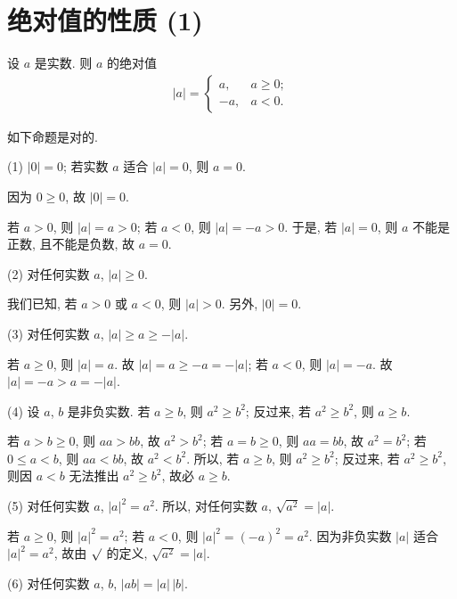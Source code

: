 \documentclass[../libro.tex]{subfiles}
\begin{document}

\section{绝对值的性质 (1)}

设 \(a\) 是实数.
则 \(a\) 的绝对值
\begin{align*}
    |a| =
    \begin{cases}
        a,  & a \geq 0; \\
        -a, & a < 0.
    \end{cases}
\end{align*}

如下命题是对的.

(1)
\(|0| = 0\);
若实数 \(a\) 适合 \(|a| = 0\), 则 \(a = 0\).

因为 \(0 \geq 0\),
故 \(|0| = 0\).

若 \(a > 0\), 则 \(|a| = a > 0\);
若 \(a < 0\), 则 \(|a| = -a > 0\).
于是, 若 \(|a| = 0\), 则 \(a\) 不能是正数,
且不能是负数, 故 \(a = 0\).

(2)
对任何实数 \(a\), \(|a| \geq 0\).

我们已知, 若 \(a > 0\) 或 \(a < 0\), 则 \(|a| > 0\).
另外, \(|0| = 0\).

(3)
对任何实数 \(a\), \(|a| \geq a \geq -|a|\).

若 \(a \geq 0\), 则 \(|a| = a\).
故 \(|a| = a \geq -a = -|a|\);
若 \(a < 0\), 则 \(|a| = -a\).
故 \(|a| = -a > a = -|a|\).

(4)
设 \(a\), \(b\) 是非负实数.
若 \(a \geq b\), 则 \(a^2 \geq b^2\);
反过来, 若 \(a^2 \geq b^2\), 则 \(a \geq b\).

若 \(a > b \geq 0\), 则 \(a a > b b\), 故 \(a^2 > b^2\);
若 \(a = b \geq 0\), 则 \(a a = b b\), 故 \(a^2 = b^2\);
若 \(0 \leq a < b\), 则 \(a a < b b\), 故 \(a^2 < b^2\).
所以, 若 \(a \geq b\), 则 \(a^2 \geq b^2\);
反过来, 若 \(a^2 \geq b^2\), 则因 \(a < b\)
无法推出 \(a^2 \geq b^2\), 故必 \(a \geq b\).

(5)
对任何实数 \(a\), \(|a|^2 = a^2\).
所以, 对任何实数 \(a\), \(\sqrt{a^2} = |a|\).

若 \(a \geq 0\), 则 \(|a|^2 = a^2\);
若 \(a < 0\), 则 \(|a|^2 = (-a)^2 = a^2\).
因为非负实数 \(|a|\) 适合 \(|a|^2 = a^2\),
故由 \(\surd\) 的定义, \(\sqrt{a^2} = |a|\).

(6)
对任何实数 \(a\), \(b\), \(|ab| = |a|\, |b|\).
\end{document}
